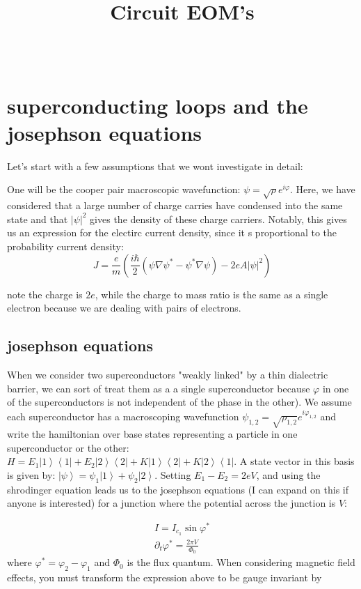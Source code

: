 \documentclass[paper=a4, twocolumn, fontsize=10pt]{article} %
\title{	
\normalfont \normalsize 
\horrule{.5pt}\\ %
\Large Circuit EOM's \\ 
\horrule{1pt}\\ %
}
\author{}
\date{\normalsize}%
\numberwithin{equation}{section} %
\numberwithin{figure}{section} %
\numberwithin{table}{section} %
\def\ket#1{\left\vert #1 \right\rangle}
\def\bra#1{\left\langle #1 \right\vert}
\begin{document}
 

\maketitle %

\section{superconducting loops and the josephson equations}

Let's start with a few assumptions that we wont investigate in detail:

One will be the cooper pair macroscopic wavefunction:
$\psi = \sqrt{\rho} e^{i\varphi}$. Here, we have considered that a large number of charge carries have condensed into the same state and that $|\psi|^2$ gives the density of these charge carriers. Notably, this gives us an expression for the electirc current density, since it s proportional to the probability current density:
 \[ J = \frac{e}{m} \left( \frac{i\hbar}{2} \left(\psi\nabla\psi^* - \psi^*\nabla\psi\right) - 2e A |\psi|^2\right) \]


 note the charge is $2e$, while the charge to mass ratio is the same as a single electron because we are dealing with pairs of electrons.
\\
\subsection{josephson equations}
When we consider two superconductors "weakly linked" by a thin dialectric barrier, we can sort of treat them as a a single superconductor because $\varphi$ in one of the superconductors is not independent of the phase in the other). We assume each superconductor has a macroscoping wavefunction $\psi_{1,2} = \sqrt{\rho_{1,2}} e^{i\varphi_{1,2}}$ and write the hamiltonian over base states representing a particle in one superconductor or the other: $H =E_1 \ket{1}\bra{1} + E_2 \ket{2}\bra{2} + K \ket{1}\bra{2} + K \ket{2}\bra{1}$. A state vector in this basis is given by: $\ket{\psi} = \psi_1 \ket{1} + \psi_2\ket{2}$.  Setting $E_1 - E_2 = 2eV$, and using the shrodinger equation leads us to the josephson equations (I can expand on this if anyone is interested) for a junction where the potential across the junction is $V$:

\begin{align}
\label{jj_eq1}
    I = I_{c_1} \sin \varphi^*
    \\
\label{jj_eq2}
    \partial_t \varphi^* = \frac{2\pi V}{\Phi_0}
\end{align}
where $\varphi^* = \varphi_2 - \varphi_1$ and $\Phi_0$ is the flux quantum. When considering magnetic field effects, you must transform the expression above to be gauge invariant by 
\end{document}
